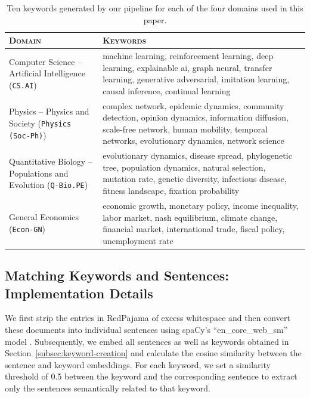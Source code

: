 \documentclass[10pt]{article}
\begin{document}
\begin{table}[t]
\centering
\caption{Ten keywords generated by our pipeline for each of the four domains used in this paper.}
\label{tab:domain-keywords}
\small
\begin{tabular}{p{4.5cm}p{9cm}}
\toprule
\textsc{Domain} & \textsc{Keywords} \\
\midrule
Computer Science -- Artificial Intelligence (\texttt{CS.AI})
& machine learning, reinforcement learning, deep learning, explainable ai, graph neural, transfer learning, generative adversarial, imitation learning, causal inference, continual learning \\
\midrule
Physics -- Physics and Society (\texttt{Physics (Soc-Ph)})
& complex network, epidemic dynamics, community detection, opinion dynamics, information diffusion, scale-free network, human mobility, temporal networks, evolutionary dynamics, network science \\
\midrule
Quantitative Biology -- Populations and Evolution (\texttt{Q-Bio.PE})
& evolutionary dynamics, disease spread, phylogenetic tree, population dynamics, natural selection, mutation rate, genetic diversity, infectious disease, fitness landscape, fixation probability \\
\midrule
General Economics (\texttt{Econ-GN})
& economic growth, monetary policy, income inequality, labor market, nash equilibrium, climate change, financial market, international trade, fiscal policy, unemployment rate \\
\bottomrule
\end{tabular}
\end{table}



\subsection{Matching Keywords and Sentences: Implementation Details}
\label{app:matching-details}

We first strip the entries in RedPajama of excess whitespace and then convert these documents into individual sentences using spaCy's ``en\_core\_web\_sm'' model \citep{honnibal2020spacy}. Subsequently, we embed all sentences as well as keywords obtained in Section~\ref{subsec:keyword-creation} and calculate the cosine similarity between the sentence and keyword embeddings. For each keyword, we set a similarity threshold of 0.5 between the keyword and the corresponding sentence to extract only the sentences semantically related to that keyword.
\end{document}
